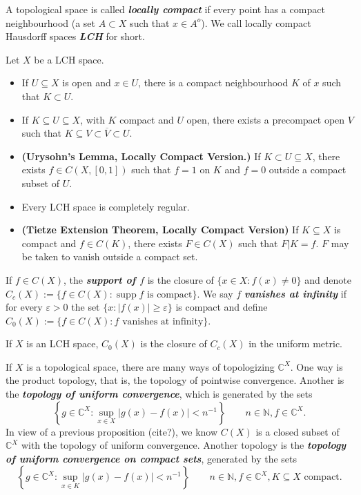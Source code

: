 \documentclass{article}
\theoremstyle{definition}
\numberwithin{equation}{section}
\newcommand{\N}{\mathbb{N}}
\newcommand{\C}{\mathbb{C}}
\begin{document}
		A topological space is called \textbf{\textit{locally compact}} if every point has a compact neighbourhood (a set $A\subset X$ such that $x\in A^o$). We call locally compact Hausdorff spaces \textbf{\textit{LCH}} for short.
		\begin{prop}Let $X$ be a LCH space.
			\begin{itemize}
				\item If $U\subseteq X$ is open and $x\in U$, there is a compact neighbourhood $K$ of $x$ such that $K\subset U$.
				\item If $K\subseteq U\subseteq X$, with $K$ compact and $U$ open, there exists a precompact open $V$ such that $K\subseteq V\subset \overline{V}\subset U$.
				\item \textbf{(Urysohn's Lemma, Locally Compact Version.)} If $K\subset U\subseteq X$, there exists $f\in C(X,[0,1])$ such that $f=1$ on $K$ and $f=0$ outside a compact subset of $U$.
				\item Every LCH space is completely regular.
				\item \textbf{(Tietze Extension Theorem, Locally Compact Version)} If $K\subseteq X$ is compact and $f\in C(K)$, there exists $F\in C(X)$ such that $F|K=f$. $F$ may be taken to vanish outside a compact set.	
			\end{itemize}
		\end{prop}
		 If $f\in C(X)$, the \textbf{\textit{support of $f$}} is the closure of $\{x\in X:f(x)\neq0\}$ and denote $C_c(X):=\{f\in C(X):\operatorname{supp}f\text{ is compact}\}$. We say $f$ \textbf{\textit{vanishes at infinity}} if for every $\varepsilon>0$ the set $\{x:|f(x)|\geq\varepsilon\}$ is compact and define $C_0(X):=\{f\in C(X):f\text{ vanishes at infinity}\}$.
		 \begin{prop}
		 	If $X$ is an LCH space, $C_0(X)$ is the closure of $C_c(X)$ in the uniform metric.
		 \end{prop}
		 If $X$ is a topological space, there are many ways of topologizing $\C^X$. One way is the product topology, that is, the topology of pointwise convergence. Another is the \textbf{\textit{topology of uniform convergence}}, which is generated by the sets
		 \[\left\{g\in\C^X:\sup_{x\in X}|g(x)-f(x)|<n^{-1}\right\}\qquad n\in\N,f\in\C^X.\]
		 In view of a previous proposition (cite?), we know $C(X)$ is a closed subset of $\C^X$ with the topology of uniform convergence. Another topology is the \textbf{\textit{topology of uniform convergence on compact sets}}, generated by the sets
			 \[\left\{g\in\C^X:\sup_{x\in K}|g(x)-f(x)|<n^{-1}\right\}\qquad n\in\N,f\in\C^X,K\subseteq X\text{ compact}.\]
\end{document}
